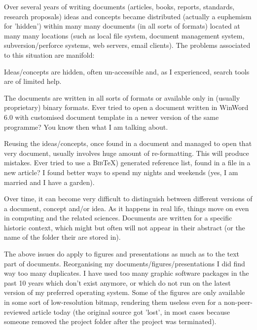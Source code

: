
Over several years of writing documents (articles, books, reports, standards, research proposals)
ideas and concepts became distributed (actually a euphemism for 'hidden') within many many documents
(in all sorts of formats) located at many many locations (such as local file system, document management 
system, subversion/perforce systems, web servers, email clients). The problems associated to this situation
are manifold:
\begin{skbnotelist}
  \item Ideas/concepts are hidden, often un-accessible and, as I experienced, search tools are of limited help.
  \item The documents are written in all sorts of formats or available only in (usually proprietary) binary
        formats. Ever tried to open a document written in  WinWord 6.0 with customised document
        template in a newer version of the same programme? You know then what I am talking about.
  \item Reusing the ideas/concepts, once found in a document and managed to open that very document,
        usually involves huge amount of re-formatting. This will produce mistakes. Ever tried to 
        use a {\scshape Bib}\TeX) generated reference list, found in a  file in a new article?
        I found better ways to spend my nights and weekends (yes, I am married and I have a garden).
  \item Over time, it can become very difficult to distinguish between different versions of a 
        document, concept and/or idea. As it happens in real life, things move on even in computing
        and the related sciences. Documents are written for a specific historic context, which might
        but often will not appear in their abstract (or the name of the folder their are stored in).
  \item The above issues do apply to figures and presentations as much as to the text part of
        documents. Reorganising my documents/figures/presentations I did find way too many duplicates.
        I have used too many graphic software packages in the past 10 years which don't exist 
        anymore, or which do not run on the latest version of my preferred operating system. Some of
        the figures are only available in some sort of low-resolution bitmap, rendering them useless
        even for a non-peer-reviewed article today (the original source got 'lost', in most cases 
        because someone removed the project folder after the project was terminated).
\end{skbnotelist}

